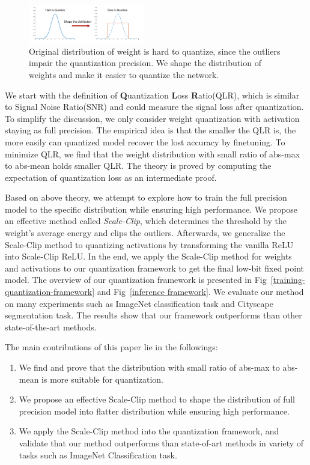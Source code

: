 \documentclass[letterpaper]{article} %
\begin{document}
\begin{figure}[ht!]
	\includegraphics[width=0.45\textwidth]{gaussian-uniform.png}
	\caption{Original distribution of weight is hard to quantize, since the outliers impair the quantization precision. We shape the distribution of weights and make it easier to quantize the network.}\label{fig:gaussian}
\end{figure}
We start with the definition of \textbf{Q}uantization \textbf{L}oss \textbf{R}atio(QLR), 
which is similar to Signal Noise Ratio(SNR) and could measure the signal loss after quantization.
To simplify the discussion, we only consider weight quantization with activation staying as full precision. 
The empirical idea is that the smaller the QLR is, 
the more easily can quantized model recover the lost accuracy by finetuning.
To minimize QLR, we find that the weight distribution with small ratio of abs-max to abs-mean holds smaller QLR.
The theory is proved by computing the expectation of quantization loss as an intermediate proof.

Based on above theory, we attempt to explore how to train the full precision model to the specific distribution while ensuring high performance.
We propose an effective method called \emph{Scale-Clip}, which determines the threshold by the weight's average energy and clips the outliers.
Afterwards, we generalize the Scale-Clip method to quantizing activations by transforming the vanilla ReLU into Scale-Clip ReLU. In the end, we apply the Scale-Clip method for weights and activations to our quantization framework to get the final low-bit fixed point model. The overview of our quantization framework is presented in Fig~\ref{training-quantization-framework} and Fig~\ref{inference framework}. 
We evaluate our method on many experiments such as ImageNet classification task and Cityscape segmentation task.
The results show that our framework outperforms than other state-of-the-art methods.

The main contributions of this paper lie in the followings:
\begin{enumerate}
	\item We find and prove that the distribution with small ratio of abs-max to abs-mean is more suitable for quantization.
	\item We propose an effective Scale-Clip method to shape the distribution of full precision model into flatter distribution while ensuring high performance.
	\item We apply the Scale-Clip method into the quantization framework, and validate that our method outperforms than state-of-art methods in variety of tasks such as ImageNet Classification task.
\end{enumerate}
\end{document}
